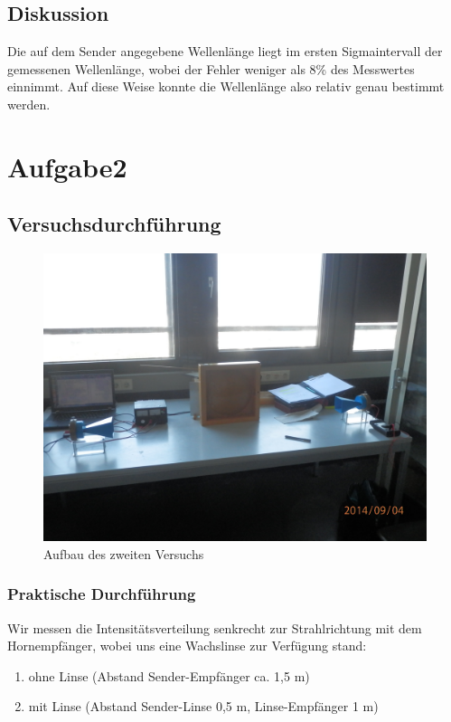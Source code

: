 \documentclass[12pt]{scrartcl}
\begin{document}
\subsection{Diskussion}
Die auf dem Sender angegebene Wellenlänge liegt im ersten Sigmaintervall der gemessenen Wellenlänge, wobei der Fehler weniger als 8\% des Messwertes einnimmt. Auf diese Weise konnte die Wellenlänge also relativ genau bestimmt werden.
\section{Aufgabe2}
\subsection{Versuchsdurchführung}
\begin{figure}[H] 
  \centering
    \includegraphics[scale = 0.1]{a_2.JPG}
  	\caption[Aufbau des zweiten Versuchs]{Aufbau des zweiten Versuchs}
  \label{fig:a_2}
\end{figure}
\subsubsection{Praktische Durchführung}
Wir messen die Intensitätsverteilung senkrecht zur Strahlrichtung mit dem Hornempfänger, wobei uns eine Wachslinse zur Verfügung stand:
\begin{enumerate}
\item ohne Linse (Abstand Sender-Empfänger ca. 1,5 m)
\item mit Linse (Abstand Sender-Linse 0,5 m, Linse-Empfänger 1 m)
\end{enumerate}
\end{document}
